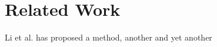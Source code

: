 \section{Related Work}
Li et al. \cite{Li} has proposed a method, 
\cite{Sutar} another and
\cite{Viggiato} yet another
